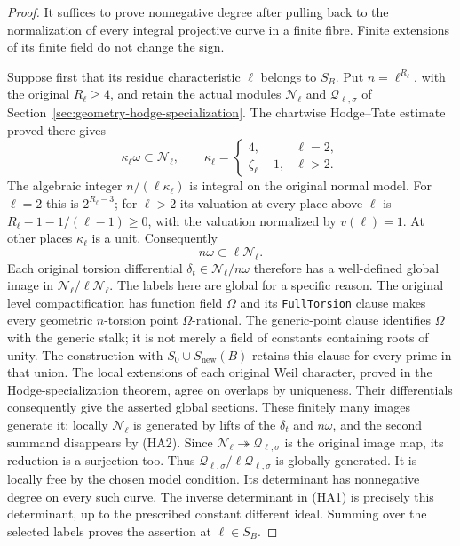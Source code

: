 \begin{proof}
It suffices to prove nonnegative degree after pulling back to the
normalization of every integral projective curve in a finite fibre.
Finite extensions of its finite field do not change the sign.

Suppose first that its residue characteristic $\ell$ belongs to
$S_B$.  Put $n=\ell^{R_\ell}$, with the original $R_\ell\ge4$,
and retain the actual modules $\mathcal N_\ell$ and
$\mathcal Q_{\ell,\sigma}$ of
Section~\ref{sec:geometry-hodge-specialization}.  The chartwise
Hodge--Tate estimate proved there gives
\[
 \kappa_\ell\omega\subset\mathcal N_\ell,
 \qquad
 \kappa_\ell=\begin{cases}4,&\ell=2,\\
                         \zeta_\ell-1,&\ell>2.
             \end{cases}
\]
The algebraic integer $n/(\ell\kappa_\ell)$ is integral on the
original normal model.  For $\ell=2$ this is $2^{R_\ell-3}$;
for $\ell>2$ its valuation at every place above $\ell$ is
$R_\ell-1-1/(\ell-1)\ge0$, with the valuation normalized by
$v(\ell)=1$.  At other places $\kappa_\ell$ is a unit.
Consequently
\[
                        n\omega\subset\ell\mathcal N_\ell.
 \tag{HA2}
\]
Each original torsion differential
$\delta_t\in\mathcal N_\ell/n\omega$ therefore has a well-defined
global image in $\mathcal N_\ell/\ell\mathcal N_\ell$.
The labels here are global for a specific reason.  The original
level compactification has function field $\Omega$ and its
\texttt{FullTorsion} clause makes every geometric $n$-torsion
point $\Omega$-rational.  The generic-point clause identifies
$\Omega$ with the generic stalk; it is not merely a field of
constants containing roots of unity.  The construction with
$S_0\cup S_{\mathrm{new}}(B)$ retains this clause for every prime
in that union.  The local extensions of each original Weil
character, proved in the Hodge-specialization theorem, agree on
overlaps by uniqueness.  Their differentials consequently give
the asserted global sections\cite{height-assembly-source}.
These finitely many images generate it: locally $\mathcal N_\ell$
is generated by lifts of the $\delta_t$ and $n\omega$, and the
second summand disappears by (HA2).  Since
$\mathcal N_\ell\twoheadrightarrow\mathcal Q_{\ell,\sigma}$
is the original image map, its reduction is a surjection too.
Thus $\mathcal Q_{\ell,\sigma}/\ell\mathcal Q_{\ell,\sigma}$
is globally generated.  It is locally free by the chosen model
condition.  Its determinant has nonnegative degree on every such
curve.  The inverse determinant in (HA1) is precisely this determinant,
up to the prescribed constant different ideal.  Summing over the
selected labels proves the assertion at $\ell\in S_B$.


\end{proof}
